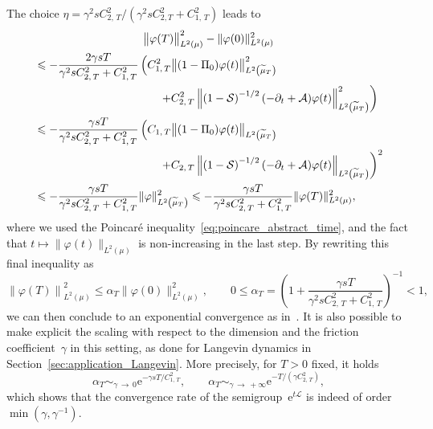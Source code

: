 \documentclass[10pt]{amsart}
\theoremstyle{definition}\newtheorem{defi}[theo]{Definition}\newtheorem{rema}[theo]{Remark}\newtheorem{exam}[theo]{Example}\newtheorem{exem}[theo]{Example}\newtheorem{nota}[theo]{Notation}
\newcommand{\rme}{\mathrm{e}}
\newcommand{\cL}{\mathcal{L}}
\newcommand{\cLs}{\mathcal{S}}
\newcommand{\cLa}{\mathcal{A}}
\renewcommand{\leq}{\leqslant}
\begin{document}
The choice $\eta = \gamma^2 s C_{2,\,T}^2/(\gamma^2 sC_{2,T}^2 + C_{1,\,T}^2)$ leads to
\begin{multline*}
\big\|\varphi(T)\big\|_{L^2(\mu)}^2 - \|\varphi(0)\|_{L^2(\mu)}^2 \\
\begin{aligned}
& \leq -\frac{2\gamma sT}{\gamma^2 sC_{2,\,T}^2 + C_{1,\,T}^2} \left(C_{1,\,T}^2 \big\| (1-\Pi_0) \varphi(t) \big\|_{L^2\left(\widetilde{\mu}_T\right)}^2\right.\\
&\mkern200mu\left. + C_{2,\,T}^2\left\| \left(1-\cLs\right)^{-1/2}(-\partial_t + \cLa) \varphi(t) \right\|_{L^2\left(\widetilde{\mu}_T\right)}^2\right) \\
& \leq -\frac{\gamma sT}{\gamma^2 sC_{2,\,T}^2 + C_{1,\,T}^2} \left(C_{1,\,T} \big\| (1-\Pi_0) \varphi(t) \big\|_{L^2\left(\widetilde{\mu}_T\right)}\right.
\\
&\mkern200mu\left. + C_{2,\,T}\left\| \left(1-\cLs\right)^{-1/2}(-\partial_t + \cLa) \varphi(t) \right\|_{L^2\left(\widetilde{\mu}_T\right)}\right)^2 \\
& \leq -\frac{\gamma sT}{\gamma^2 sC_{2,\,T}^2 + C_{1,\,T}^2} \|\varphi\|_{L^2\left(\widetilde{\mu}_T\right)}^2 \leq -\frac{\gamma s T}{\gamma^2 sC_{2,\,T}^2 + C_{1,\,T}^2} \|\varphi(T)\|_{L^2(\mu)}^2,
\end{aligned}
\end{multline*}
where we used the Poincaré inequality~\eqref{eq:poincare_abstract_time}, and the fact that $t \mapsto \|\varphi(t)\|_{L^2(\mu)}$ is non-increasing in the last step. By rewriting this final inequality as
\[
\left\|\varphi(T)\right\|_{L^2(\mu)}^2 \leq \alpha_T \|\varphi(0)\|_{L^2(\mu)}^2, \qquad 0 \leq \alpha_T = \left(1+\frac{\gamma sT}{\gamma^2 sC_{2,\,T}^2 + C_{1,\,T}^2}\right)^{-1} < 1,
\]
we can then conclude to an exponential convergence as in~\cite{AM19,CLW19}. It is also possible to make explicit the scaling with respect to the dimension and the friction coefficient~$\gamma$ in this setting, as done for Langevin dynamics in Section~\ref{sec:application_Langevin}. More precisely, for $T>0$ fixed, it holds
\[
\alpha_T \mathop{\sim}_{\gamma\,\to\,0} \rme^{-\gamma s T/C_{1,\,T}^2}, \qquad \alpha_T \mathop{\sim}_{\gamma\,\to\,+\infty} \rme^{-T/\left(\gamma C_{2,\,T}^2\right)},
\]
which shows that the convergence rate of the semigroup~$\rme^{t \cL}$ is indeed of order $\min(\gamma,\gamma^{-1})$.
\end{document}
